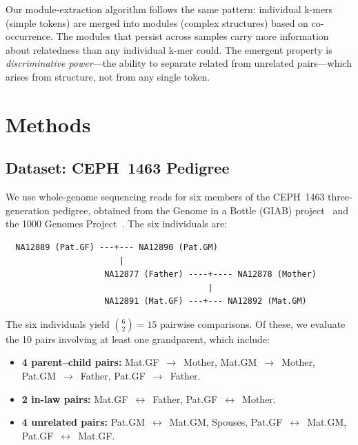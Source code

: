\documentclass{../yalumba}
\begin{document}
Our module-extraction algorithm follows the same pattern: individual k-mers
(simple tokens) are merged into modules (complex structures) based on
co-occurrence.  The modules that persist across samples carry more information
about relatedness than any individual k-mer could.  The emergent property is
\emph{discriminative power}---the ability to separate related from unrelated
pairs---which arises from structure, not from any single token.


\section{Methods}
\label{sec:methods}

\subsection{Dataset: CEPH~1463 Pedigree}

We use whole-genome sequencing reads for six members of the CEPH~1463
three-generation pedigree, obtained from the Genome in a Bottle (GIAB)
project~\cite{zook2019giab} and the 1000 Genomes Project~\cite{1000genomes2015}.
The six individuals are:

\begin{pedigree}
\begin{verbatim}
  NA12889 (Pat.GF) ---+--- NA12890 (Pat.GM)
                       |
                    NA12877 (Father) ----+---- NA12878 (Mother)
                                         |
                    NA12891 (Mat.GF) ---+--- NA12892 (Mat.GM)
\end{verbatim}
\end{pedigree}


\noindent The six individuals yield $\binom{6}{2} = 15$ pairwise comparisons.
Of these, we evaluate the 10 pairs involving at least one grandparent, which
include:

\begin{itemize}
  \item \textbf{4 parent--child pairs:}  Mat.GF~$\to$~Mother,
        Mat.GM~$\to$~Mother, Pat.GM~$\to$~Father, Pat.GF~$\to$~Father.
  \item \textbf{2 in-law pairs:}  Mat.GF~$\leftrightarrow$~Father,
        Pat.GF~$\leftrightarrow$~Mother.
  \item \textbf{4 unrelated pairs:}  Pat.GM~$\leftrightarrow$~Mat.GM,
        Spouses, Pat.GF~$\leftrightarrow$~Mat.GM,
        Pat.GF~$\leftrightarrow$~Mat.GF.
\end{itemize}
\end{document}
